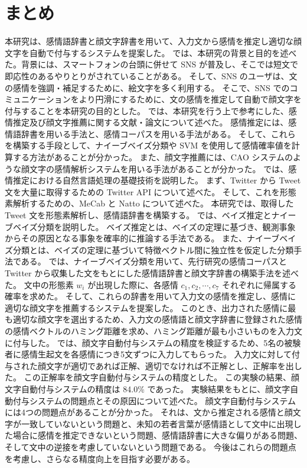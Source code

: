 \documentclass[11pt,a4j]{jsarticle}
\begin{document}
\section{まとめ}\label{sec:summary}
本研究は、感情語辞書と顔文字辞書を用いて、入力文から感情を推定し適切な顔文字を自動で付与するシステムを提案した。
では、本研究の背景と目的を述べた。背景には、スマートフォンの台頭に併せて SNS が普及し、そこでは短文で即応性のあるやりとりがされていることがある。
そして、SNS のユーザは、文の感情を強調・補足するために、絵文字を多く利用する。
そこで、SNS でのコミュニケーションをより円滑にするために、文の感情を推定して自動で顔文字を付与することを本研究の目的とした。
では、本研究を行う上で参考にした、感情推定及び顔文字推薦に関する文献・論文について述べた。
感情推定には、感情語辞書を用いる手法と、感情コーパスを用いる手法がある。
そして、これらを構築する手段として、ナイーブベイズ分類や SVM を使用して感情確率値を計算する方法があることが分かった。
また、顔文字推薦には、CAO システムのような顔文字の感情解析システムを用いる手法があることが分かった。
では、感情推定における自然言語処理の基礎技術を説明した。
まず、Twitter から Tweet 文を大量に取得するための Twitter API について述べた。
そして、これを形態素解析するための、MeCab と Natto について述べた。
本研究では、取得した Tweet 文を形態素解析し、感情語辞書を構築する。
では、ベイズ推定とナイーブベイズ分類を説明した。
ベイズ推定とは、ベイズの定理に基づき、観測事象からその原因となる事象を確率的に推論する手法である。
また、ナイーブベイズ分類とは、ベイズの定理に基づいて特徴ベクトル間に独立性を仮定した分類手法である。
では、ナイーブベイズ分類を用いて、先行研究の感情コーパスとTwitter から収集した文をもとにした感情語辞書と顔文字辞書の構築手法を述べた。
文中の形態素 $w_i$ が出現した際に、各感情 $c_1,c_2, \cdots ,c_7$ それぞれに帰属する確率を求めた。
そして、これらの辞書を用いて入力文の感情を推定し、感情に適切な顔文字を推薦するシステムを提案した。
このとき、出力された感情に最も適切な顔文字を選出するため、入力文の感情語と顔文字辞書に登録された感情の感情ベクトルのハミング距離を求め、ハミング距離が最も小さいものを入力文に付与した。
では、顔文字自動付与システムの精度を検証するため、5名の被験者に感情生起文を各感情につき5文ずつに入力してもらった。
入力文に対して付与された顔文字が適切であれば正解、適切でなければ不正解とし、正解率を出した。
この正解率を顔文字自動付与システムの精度とした。
この実験の結果、顔文字自動付与システムの精度は 84.0\% であった。
実験結果をもとに、顔文字自動付与システムの問題点とその原因について述べた。
顔文字自動付与システムには4つの問題点があることが分かった。
それは、文から推定される感情と顔文字が一致していないという問題と、未知の若者言葉が感情語として文中に出現した場合に感情を推定できないという問題、感情語辞書に大きな偏りがある問題、そして文中の逆接を考慮していないという問題である。
今後はこれらの問題点を考慮し、さらなる精度向上を目指す必要がある。

 \clearpage
 
\end{document}

